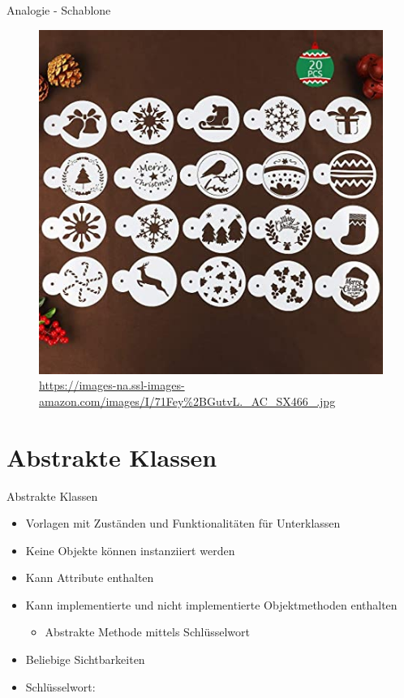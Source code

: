 \documentclass{../tuda-beamer}
\begin{document}
    \begin{frame}{Analogie - Schablone}
        \begin{figure}[h]
            \centering
            \includegraphics[width=.3\linewidth]{graphics/cookies}
            \caption{\url{https://images-na.ssl-images-amazon.com/images/I/71Fey\%2BGutvL._AC_SX466_.jpg}}
        \end{figure}
    \end{frame}

    \begin{frame}[c]
        
    \end{frame}

    \begin{frame}[c]
        
    \end{frame}

    \begin{frame}[c]
        
    \end{frame}

    \begin{frame}[c]
        
    \end{frame}


    \section{Abstrakte Klassen}
    \begin{frame}{Abstrakte Klassen}
        \begin{itemize}
            \item Vorlagen mit Zuständen und Funktionalitäten für Unterklassen
            \item Keine Objekte können instanziiert werden
            \item Kann Attribute enthalten
            \item Kann implementierte und nicht implementierte Objektmethoden enthalten
            \begin{itemize}
                \item Abstrakte Methode mittels Schlüsselwort 
            \end{itemize}
            \item Beliebige Sichtbarkeiten
            \item Schlüsselwort: 
        \end{itemize}
    \end{frame}
\end{document}
